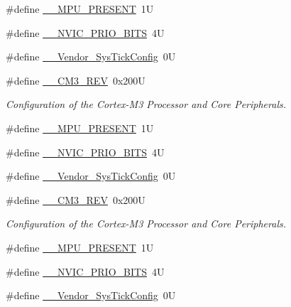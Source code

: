 \begin{DoxyCompactItemize}
\#define \hyperlink{group___configuration__section__for___c_m_s_i_s_ga4127d1b31aaf336fab3d7329d117f448}{\-\_\-\-\_\-\-M\-P\-U\-\_\-\-P\-R\-E\-S\-E\-N\-T}~1\-U
\item 
\#define \hyperlink{group___configuration__section__for___c_m_s_i_s_gae3fe3587d5100c787e02102ce3944460}{\-\_\-\-\_\-\-N\-V\-I\-C\-\_\-\-P\-R\-I\-O\-\_\-\-B\-I\-T\-S}~4\-U
\item 
\#define \hyperlink{group___configuration__section__for___c_m_s_i_s_gab58771b4ec03f9bdddc84770f7c95c68}{\-\_\-\-\_\-\-Vendor\-\_\-\-Sys\-Tick\-Config}~0\-U
\item 
\#define \hyperlink{group___configuration__section__for___c_m_s_i_s_gac6a3f185c4640e06443c18b3c8d93f53}{\-\_\-\-\_\-\-C\-M3\-\_\-\-R\-E\-V}~0x200\-U
\begin{DoxyCompactList}\small\item\em Configuration of the Cortex-\/\-M3 Processor and Core Peripherals. \end{DoxyCompactList}\item 
\#define \hyperlink{group___configuration__section__for___c_m_s_i_s_ga4127d1b31aaf336fab3d7329d117f448}{\-\_\-\-\_\-\-M\-P\-U\-\_\-\-P\-R\-E\-S\-E\-N\-T}~1\-U
\item 
\#define \hyperlink{group___configuration__section__for___c_m_s_i_s_gae3fe3587d5100c787e02102ce3944460}{\-\_\-\-\_\-\-N\-V\-I\-C\-\_\-\-P\-R\-I\-O\-\_\-\-B\-I\-T\-S}~4\-U
\item 
\#define \hyperlink{group___configuration__section__for___c_m_s_i_s_gab58771b4ec03f9bdddc84770f7c95c68}{\-\_\-\-\_\-\-Vendor\-\_\-\-Sys\-Tick\-Config}~0\-U
\item 
\#define \hyperlink{group___configuration__section__for___c_m_s_i_s_gac6a3f185c4640e06443c18b3c8d93f53}{\-\_\-\-\_\-\-C\-M3\-\_\-\-R\-E\-V}~0x200\-U
\begin{DoxyCompactList}\small\item\em Configuration of the Cortex-\/\-M3 Processor and Core Peripherals. \end{DoxyCompactList}\item 
\#define \hyperlink{group___configuration__section__for___c_m_s_i_s_ga4127d1b31aaf336fab3d7329d117f448}{\-\_\-\-\_\-\-M\-P\-U\-\_\-\-P\-R\-E\-S\-E\-N\-T}~1\-U
\item 
\#define \hyperlink{group___configuration__section__for___c_m_s_i_s_gae3fe3587d5100c787e02102ce3944460}{\-\_\-\-\_\-\-N\-V\-I\-C\-\_\-\-P\-R\-I\-O\-\_\-\-B\-I\-T\-S}~4\-U
\item 
\#define \hyperlink{group___configuration__section__for___c_m_s_i_s_gab58771b4ec03f9bdddc84770f7c95c68}{\-\_\-\-\_\-\-Vendor\-\_\-\-Sys\-Tick\-Config}~0\-U
\end{DoxyCompactItemize}


